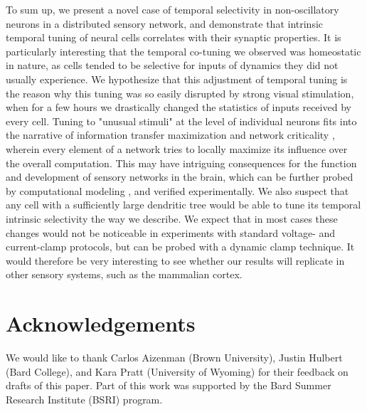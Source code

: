 \documentclass{article}
\begin{document}
To sum up, we present a novel case of temporal selectivity in non-oscillatory neurons in a distributed sensory network, and demonstrate that intrinsic temporal tuning of neural cells correlates with their synaptic properties. It is particularly interesting that the temporal co-tuning we observed was homeostatic in nature, as cells tended to be selective for inputs of dynamics they did not usually experience. We hypothesize that this adjustment of temporal tuning is the reason why this tuning was so easily disrupted by strong visual stimulation, when for a few hours we drastically changed the statistics of inputs received by every cell. Tuning to "unusual stimuli" at the level of individual neurons fits into the narrative of information transfer maximization \citep{stemmler1999information,brenner2000} and network criticality \citep{rubinov2011}, wherein every element of a network tries to locally maximize its influence over the overall computation. This may have intriguing consequences for the function and development of sensory networks in the brain, which can be further probed by computational modeling \citep{khakhalin2014,jang2016}, and verified experimentally. We also suspect that any cell with a sufficiently large dendritic tree would be able to tune its temporal intrinsic selectivity the way we describe. We expect that in most cases these changes would not be noticeable in experiments with standard voltage- and current-clamp protocols, but can be probed with a dynamic clamp technique. It would therefore be very interesting to see whether our results will replicate in other sensory systems, such as the mammalian cortex.


\section*{Acknowledgements}

We would like to thank Carlos Aizenman (Brown University), Justin Hulbert (Bard College), and Kara Pratt (University of Wyoming) for their feedback on drafts of this paper. Part of this work was supported by the Bard Summer Research Institute (BSRI) program.

\end{document}
